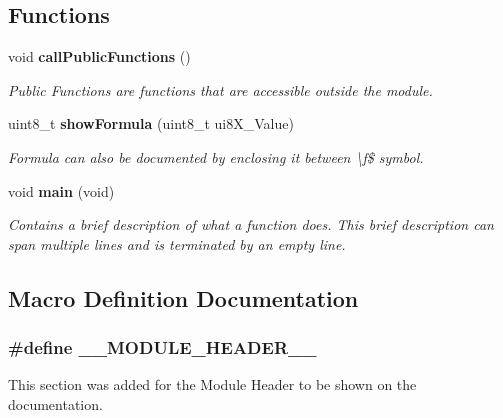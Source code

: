 \subsection*{Functions}
\begin{DoxyCompactItemize}
\item 
void {\bf call\-Public\-Functions} ()
\begin{DoxyCompactList}\small\item\em Public Functions are functions that are accessible outside the module. \end{DoxyCompactList}\item 
uint8\-\_\-t {\bf show\-Formula} (uint8\-\_\-t ui8\-X\-\_\-\-Value)
\begin{DoxyCompactList}\small\item\em Formula can also be documented by enclosing it between \textbackslash{}f\$ symbol. \end{DoxyCompactList}\item 
void {\bf main} (void)
\begin{DoxyCompactList}\small\item\em Contains a brief description of what a function does. This brief description can span multiple lines and is terminated by an empty line. \end{DoxyCompactList}\end{DoxyCompactItemize}


\subsection{Macro Definition Documentation}
\subsubsection[{\-\_\-\-\_\-\-M\-O\-D\-U\-L\-E\-\_\-\-H\-E\-A\-D\-E\-R\-\_\-\-\_\-}]{\setlength{\rightskip}{0pt plus 5cm}\#define \-\_\-\-\_\-\-M\-O\-D\-U\-L\-E\-\_\-\-H\-E\-A\-D\-E\-R\-\_\-\-\_\-}\label{____lib__template_8c_af75326f3ca42905e32d07f10c31e78fb}


This section was added for the Module Header to be shown on the documentation. 

